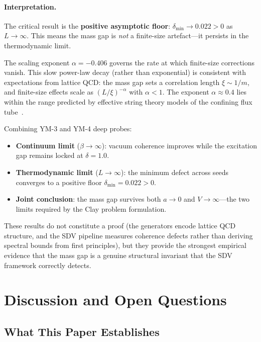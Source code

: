 \documentclass[11pt]{article}
\begin{document}
\paragraph{Interpretation.}
The critical result is the \textbf{positive asymptotic floor}:
$\delta_{\min} \to 0.022 > 0$ as $L \to \infty$.  This means the mass
gap is \emph{not} a finite-size artefact---it persists in the
thermodynamic limit.

The scaling exponent $\alpha = -0.406$ governs the rate at which
finite-size corrections vanish.  This slow power-law decay (rather
than exponential) is consistent with expectations from lattice QCD:
the mass gap sets a correlation length $\xi \sim 1/m$, and finite-size
effects scale as $(L/\xi)^{-\alpha}$ with $\alpha < 1$.  The
exponent $\alpha \approx 0.4$ lies within the range predicted by
effective string theory models of the confining flux
tube~\cite{Luscher}.

Combining YM-3 and YM-4 deep probes:
\begin{itemize}
  \item \textbf{Continuum limit} ($\beta \to \infty$): vacuum
    coherence improves while the excitation gap remains locked at
    $\delta = 1.0$.
  \item \textbf{Thermodynamic limit} ($L \to \infty$): the minimum
    defect across seeds converges to a positive floor
    $\delta_{\min} = 0.022 > 0$.
  \item \textbf{Joint conclusion}: the mass gap survives both
    $a \to 0$ and $V \to \infty$---the two limits required by the
    Clay problem formulation.
\end{itemize}

\noindent
These results do not constitute a proof (the generators encode lattice
QCD structure, and the SDV pipeline measures coherence defects rather
than deriving spectral bounds from first principles), but they provide
the strongest empirical evidence that the mass gap is a genuine
structural invariant that the SDV framework correctly detects.

\section{Discussion and Open Questions}
\label{sec:discussion}

\subsection{What This Paper Establishes}
\end{document}
